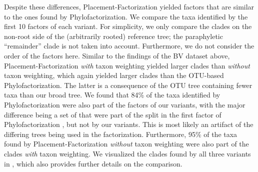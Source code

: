 Despite these differences, Placement-Factorization yielded factors that are similar to the ones found by Phylofactorization.
We compare the taxa identified by the first \num{10} factors of each variant.
For simplicity, we only compare the clades on the non-root side of the (arbitrarily rooted) reference tree;
the paraphyletic ``remainder'' clade is not taken into account.
Furthermore, we do not consider the order of the factors here.
Similar to the findings of the \ac{BV} dataset above,
Placement-Factorization \emph{with} taxon weighting yielded larger clades than \emph{without} taxon weighting,
which again yielded larger clades than the OTU-based Phylofactorization.
The latter is a consequence of the OTU tree containing fewer taxa than our broad  tree.
We found that 84\% of the taxa identified by Phylofactorization were also part of the factors of our variants,
with the major difference being a set of 
that were part of the split in the first factor of Phylofactorization \cite{Washburne2017a}, but not by our variants.
This is most likely an artifact of the differing trees being used in the factorization.
Furthermore, 95\% of the taxa found by Placement-Factorization \emph{without} taxon weighting
were also part of the clades \emph{with} taxon weighting.
We visualized the clades found by all three variants in ,
which also provides further details on the comparison.

